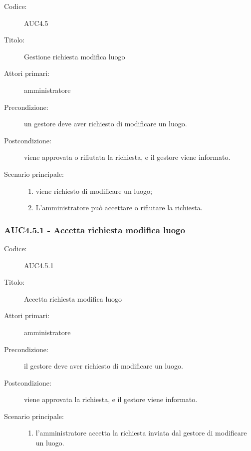 \documentclass[casi-duso]{subfiles}
\begin{document}
\begin{description}
  \item[Codice:] AUC4.5
  \item[Titolo:] Gestione richiesta modifica luogo
  \item[Attori primari:] amministratore
  \item[Precondizione:] un gestore deve aver richiesto di modificare un luogo.
  \item[Postcondizione:] viene approvata o rifiutata la richiesta, e il gestore viene informato.
  \item[Scenario principale:]
  \begin{enumerate}
    \item viene richiesto di modificare un luogo;
    \item L'amministratore può accettare o rifiutare la richiesta.
  \end{enumerate}
\end{description}

\subsubsection{AUC4.5.1 - Accetta richiesta modifica luogo}%
\label{subsub:AUC4.5.1}
\begin{description}
  \item[Codice:] AUC4.5.1
  \item[Titolo:] Accetta richiesta modifica luogo
  \item[Attori primari:] amministratore
  \item[Precondizione:] il gestore deve aver richiesto di modificare un luogo.
  \item[Postcondizione:] viene approvata la richiesta, e il gestore viene informato.
  \item[Scenario principale:]
  \begin{enumerate}
    \item  l'amministratore accetta la richiesta inviata dal gestore di modificare un luogo.
  \end{enumerate}
\end{description}
\end{document}
